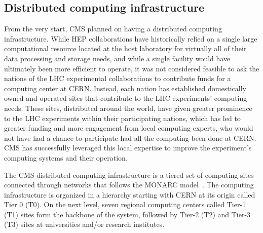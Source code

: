 \subsection{Distributed computing infrastructure}





From the very start, CMS planned on having a distributed computing
infrastructure.  While HEP collaborations have historically relied on a
single large computational resource located at the host laboratory for
virtually all of their data processing and storage needs, and while a
single facility would have ultimately been more efficient to operate, it
was not considered feasible to ask the nations of the LHC experimental
collaborations to contribute funds for a computing center at CERN.
Instead, each nation has established domestically owned and operated sites
that contribute to the LHC experiments' computing needs.  These sites,
distributed around the world, have given greater prominence to the LHC
experiments within their participating nations, which has led to greater
funding and more engagement from local computing experts, who would not
have had a chance to participate had all the computing been done at CERN.
CMS has successfully leveraged this local expertise to improve the
experiment's computing systems and their operation.

The CMS distributed computing infrastructure is a tiered set of computing
sites connected through networks that follows the MONARC
model~\cite{MONARC}. The computing infrastructure is organized in a
hierarchy starting with CERN at its origin called Tier 0 (T0).  On the next
level, seven regional computing centers called Tier-1 (T1) sites form the
backbone of the system, followed by Tier-2 (T2) and Tier-3 (T3) sites at
universities and/or research institutes.  

